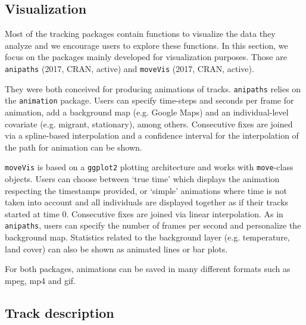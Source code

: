 \documentclass[a4paper,12pt]{article}
\newcommand{\Rpkg}[1]{\texttt{#1}}
\begin{document}
\subsection*{Visualization}

Most of the tracking packages contain functions to visualize the data they analyze and we encourage users to explore these functions. 
In this section, we focus on the packages mainly developed for visualization purposes. Those are \Rpkg{anipaths} (2017, CRAN, active) and \Rpkg{moveVis} (2017, CRAN, active).

They were both conceived for producing animations of tracks. \Rpkg{anipaths} relies on the \Rpkg{animation} package. Users can specify time-steps and seconds per frame for animation, add a background map (e.g. Google Maps) and an individual-level covariate (e.g. migrant, stationary), among others. Consecutive fixes are joined via a spline-based interpolation and a confidence interval for the interpolation of the path for animation can be shown. 

\Rpkg{moveVis} is based on a \Rpkg{ggplot2} plotting architecture and works with \Rpkg{move}-class objects. Users can choose between `true time' which displays the animation respecting the timestamps provided, or `simple' animations where time is not taken into account and all individuals are displayed together as if their tracks started at time 0. Consecutive fixes are joined via linear interpolation. As in \Rpkg{anipaths}, users can specify the number of frames per second and personalize the background map. Statistics related to the background layer (e.g. temperature, land cover) can also be shown as animated lines or bar plots. 

For both packages, animations can be saved in many different formats such as mpeg, mp4 and gif. 

\subsection*{Track description}
\end{document}
